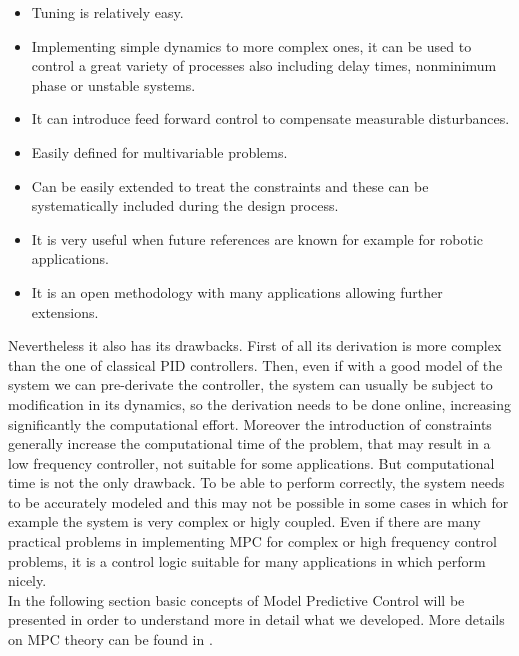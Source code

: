 \begin{itemize}
\item Tuning is relatively easy.
\item Implementing simple dynamics to more complex ones, it can be used to control a great variety of processes also including delay times, nonminimum phase or unstable systems.
\item It can introduce feed forward control to compensate measurable disturbances.
\item Easily defined for multivariable problems.
\item Can be easily extended to treat the constraints and these can be systematically included during the design process.
\item It is very useful when future references are
known for example for robotic applications.
\item It is an open methodology with many applications allowing further extensions.
\end{itemize}

Nevertheless it also has its drawbacks. First of all its derivation is more complex than the one of classical PID controllers. Then, even if with a good model of the system we can pre-derivate the controller, the system can usually be subject to modification in its dynamics, so the derivation needs to be done online, increasing significantly the computational effort. Moreover the introduction of constraints generally increase the computational time of the problem, that may result in a low frequency controller, not suitable for some applications.
But computational time is not the only drawback. To be able to perform correctly, the system needs to be accurately modeled and this may not be possible in some cases in which for example the system is very complex or higly coupled.
Even if there are many practical problems in implementing MPC for complex or high frequency control problems, it is a control logic suitable for many applications in which perform nicely. 
\\In the following section basic concepts of Model Predictive Control will be presented in order to understand more in detail what we developed. More details on MPC theory can be found in \cite{camacho2013model}.
